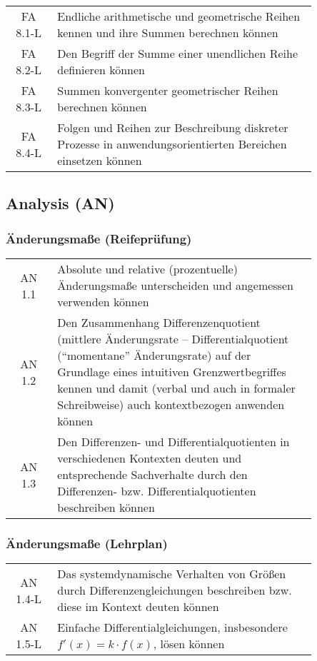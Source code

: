 \documentclass[a4paper,12pt]{article}
\begin{document}
\begin{em}
\begin{tabular}{cp{0.85\linewidth}}
FA 8.1-L & Endliche arithmetische und geometrische Reihen kennen und ihre Summen berechnen können\\
FA 8.2-L & Den Begriff der Summe einer unendlichen Reihe definieren können\\
FA 8.3-L & Summen konvergenter geometrischer Reihen berechnen können\\
FA 8.4-L & Folgen und Reihen zur Beschreibung diskreter Prozesse in anwendungsorientierten Bereichen einsetzen können\\
\end{tabular}

\end{em}

\newpage

\subsection{Analysis (AN)}

\subsubsection{Änderungsmaße (Reifeprüfung)}
\begin{tabular}{cp{0.85\linewidth}}
AN 1.1 & Absolute und relative (prozentuelle) Änderungsmaße unterscheiden und angemessen verwenden können\\
AN 1.2 & Den Zusammenhang Differenzenquotient (mittlere Änderungsrate – Differentialquotient ("`momentane"' Änderungsrate) auf der Grundlage eines intuitiven Grenzwertbegriffes kennen und damit (verbal und auch in formaler Schreibweise) auch kontextbezogen anwenden können\\
AN 1.3 & Den Differenzen- und Differentialquotienten in verschiedenen Kontexten deuten und entsprechende Sachverhalte durch den Differenzen- bzw. Differentialquotienten beschreiben können\\
\end{tabular}

\subsubsection{Änderungsmaße (Lehrplan)}
\begin{em}
\begin{tabular}{cp{0.85\linewidth}}
AN 1.4-L & Das systemdynamische Verhalten von Größen durch Differenzengleichungen beschreiben bzw. diese im Kontext deuten können \\
AN 1.5-L & Einfache Differentialgleichungen, insbesondere $f'(x)= k\cdot f(x)$, lösen können\\
\end{tabular}
\end{em}
\end{document}
